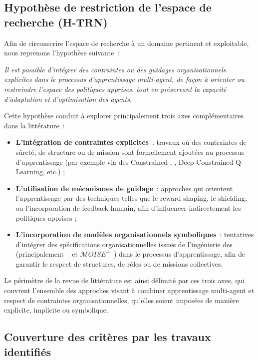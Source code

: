 \subsection*{Hypothèse de restriction de l’espace de recherche (\textbf{H-TRN})}

Afin de circonscrire l’espace de recherche à un domaine pertinent et exploitable, nous reprenons l’hypothèse suivante~:

\textit{Il est possible d’intégrer des contraintes ou des guidages organisationnels explicites dans le processus d’apprentissage multi-agent, de façon à orienter ou restreindre l’espace des politiques apprises, tout en préservant la capacité d’adaptation et d’optimisation des agents.}

Cette hypothèse conduit à explorer principalement trois axes complémentaires dans la littérature~:
\begin{itemize}
    \item \textbf{L’intégration de contraintes explicites}~: travaux où des contraintes de sûreté, de structure ou de mission sont formellement ajoutées au processus d’apprentissage (par exemple via des Constrained , , Deep Constrained Q-Learning, etc.) ;
    \item \textbf{L’utilisation de mécanismes de guidage}~: approches qui orientent l’apprentissage par des techniques telles que le reward shaping, le shielding, ou l’incorporation de feedback humain, afin d’influencer indirectement les politiques apprises ;
    \item \textbf{L’incorporation de modèles organisationnels symboliques}~: tentatives d’intégrer des spécifications organisationnelles issues de l’ingénierie des  (principalement ~\cite{Ferber2004} et $\mathcal{M}OISE^+$~\cite{hubner2002moise}) dans le processus d’apprentissage, afin de garantir le respect de structures, de rôles ou de missions collectives.
\end{itemize}

Le périmètre de la revue de littérature est ainsi délimité par ces trois axes, qui couvrent l’ensemble des approches visant à combiner apprentissage multi-agent et respect de contraintes organisationnelles, qu’elles soient imposées de manière explicite, implicite ou symbolique.

\subsection*{Couverture des critères par les travaux identifiés}

